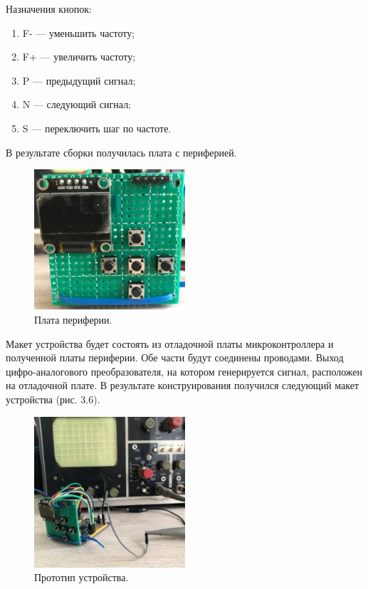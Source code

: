 	Назначения кнопок:
	\begin{enumerate}
	\item F- --- уменьшить частоту;
	\item F+ --- увеличить частоту;
	\item P --- предыдущий сигнал;
	\item N --- следующий сигнал;
	\item S --- переключить шаг по частоте.
	\end{enumerate}
	
	В результате сборки получилась плата с периферией.

	\begin{figure}[H]
    \centering
    \includegraphics[width=0.5\textwidth]{../image/m1.jpeg}
    \caption{Плата периферии.}
	\end{figure}	
	
	Макет устройства будет состоять из отладочной платы микроконтроллера и полученной платы периферии. Обе части будут соединены проводами. Выход цифро-аналогового преобразователя, на котором генерируется сигнал, расположен на отладочной плате. В результате конструирования получился следующий макет устройства (рис. 3.6).

	\begin{figure}[H]
    \centering
    \includegraphics[width=0.5\textwidth]{../image/m2.jpg}
    \caption{Прототип устройства.}
	\end{figure}	

